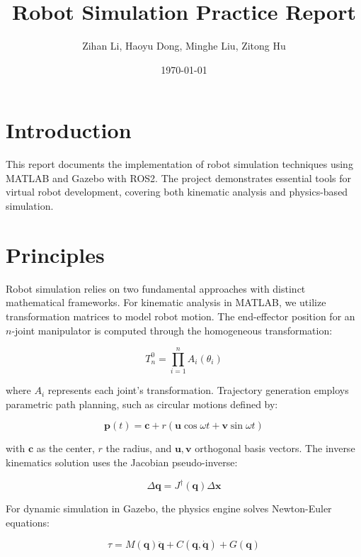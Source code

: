 \documentclass{article}
\title{Robot Simulation Practice Report}
\author{Zihan Li, Haoyu Dong, Minghe Liu, Zitong Hu}
\date{\today}
\begin{document}
\maketitle

\section{Introduction}

This report documents the implementation of robot simulation techniques using MATLAB and Gazebo with ROS2. The project demonstrates essential tools for virtual robot development, covering both kinematic analysis and physics-based simulation.

\section{Principles}

Robot simulation relies on two fundamental approaches with distinct mathematical frameworks. For kinematic analysis in MATLAB, we utilize transformation matrices to model robot motion. The end-effector position for an $n$-joint manipulator is computed through the homogeneous transformation:

\begin{equation}
T_n^0 = \prod_{i=1}^n A_i(\theta_i)
\end{equation}

where $A_i$ represents each joint's transformation. Trajectory generation employs parametric path planning, such as circular motions defined by:

\begin{equation}
\mathbf{p}(t) = \mathbf{c} + r(\mathbf{u}\cos\omega t + \mathbf{v}\sin\omega t)
\end{equation}

with $\mathbf{c}$ as the center, $r$ the radius, and $\mathbf{u},\mathbf{v}$ orthogonal basis vectors. The inverse kinematics solution uses the Jacobian pseudo-inverse:

\begin{equation}
\Delta\mathbf{q} = J^\dagger(\mathbf{q})\Delta\mathbf{x}
\end{equation}

For dynamic simulation in Gazebo, the physics engine solves Newton-Euler equations:

\begin{equation}
\tau = M(\mathbf{q})\ddot{\mathbf{q}} + C(\mathbf{q},\dot{\mathbf{q}}) + G(\mathbf{q})
\end{equation}
\end{document}
